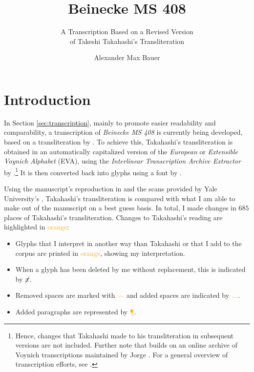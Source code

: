 \documentclass{scrarticle}
\title{Beinecke MS 408}
\subtitle{A Transcription Based on a Revised Version\\of Takeshi Takahashi's Transliteration}
\author{Alexander Max Bauer}
\date{}
\begin{document}
\maketitle

\clearpage
\tableofcontents


\clearpage
\section{Introduction}\label{sec:introduction}
In Section \ref{sec:transcription}, mainly to promote easier readability and comparability, a transcription of \textit{Beinecke MS 408} is currently being developed, based on a transliteration by \citet{takahashi_voynich_2004}.
To achieve this, Takahashi's transliteration is obtained in an automatically capitalized version of the \textit{European} or \textit{Extensible Voynich Alphabet} (EVA), using the \textit{Interlinear Transcription Archive Extractor} by \citet{schwerdtfeger_voynich_2004}.\footnote{Hence, changes that Takahashi made to his transliteration in subsequent versions are not included. Further note that \citet{schwerdtfeger_voynich_2004} builds on an online archive of Voynich transcriptions maintained by Jorge \citet{stolfi_voynich_1998}. For a general overview of transcription efforts, see \citet{zandbergen_text_2023}.}
It is then converted back into glyphs using a font by \citet{bettencourt_voynich_2019}.

Using the manuscript's reproduction in \citet{clemens_voynich_2016} and the scans provided by Yale University's \citet{beinecke_voynich_2004}, Takahashi's transliteration is compared with what I am able to make out of the manuscript on a best guess basis.
In total, I made changes in $685$ places of Takahashi's transliteration.
Changes to Takahashi's reading are highlighted in \textcolor{orange}{orange}:

\begin{itemize}
   \item Glyphs that I interpret in another way than Takahashi or that I add to the corpus are printed in \textcolor{orange}{orange}, showing my interpretation.
   \item When a glyph has been deleted by me without replacement, this is indicated by \textcolor{orange}{$\cancel{x}$}.
   \item Removed spaces are marked with \textcolor{orange}{$\frown$} and added spaces are indicated by \textcolor{orange}{$\smile$}.
   \item Added paragraphs are represented by \textcolor{orange}{{\P}}.
\end{itemize}
\end{document}
